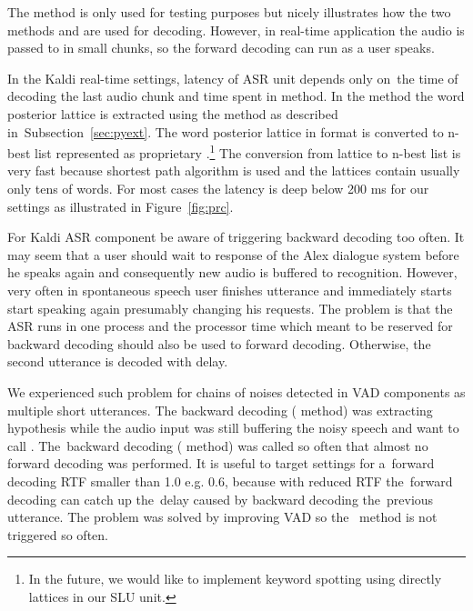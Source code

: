 
The method  is only used for testing purposes but nicely illustrates how the two methods  and  are used for decoding. 
However, in real-time application the audio is passed to  in small chunks, so the forward decoding can run as a user speaks. 

In the Kaldi real-time settings, latency of \ac{ASR} unit depends only on~the time of decoding the last audio chunk and time spent in  method.
In the  method the word posterior lattice is extracted using the  method as described in~Subsection~\ref{sec:pyext}. 
The word posterior lattice in  format is converted to n-best list represented as proprietary .\footnote{In the future, we would like to implement keyword spotting using directly  lattices in our \ac{SLU} unit.}
The conversion from lattice to n-best list is very fast because  shortest path algorithm is used and the lattices contain usually only tens of words.
For most cases the latency is deep below 200 ms for our settings as illustrated in Figure~\ref{fig:prc}.

For Kaldi \ac{ASR} component be aware of triggering backward decoding too often. 
It may seem that a user should wait to response of the Alex dialogue system before he speaks again and consequently new audio is buffered to recognition.
However, very often in spontaneous speech user finishes utterance and immediately starts start speaking again presumably changing his requests.
The problem is that the \ac{ASR} runs in one process and the processor time which meant to be reserved for backward decoding should also be used to forward decoding.
Otherwise, the second utterance is decoded with delay.

We experienced such problem for chains of noises detected in \ac{VAD} components as multiple short utterances.
The backward decoding ( method) was extracting hypothesis while the audio input was still buffering the noisy speech and want to call .
The~backward decoding ( method) was called so often that almost no forward decoding was performed.
It is useful to target settings for a~forward decoding \ac{RTF} smaller than 1.0 e.g. 0.6, because with reduced RTF the~forward decoding can catch up the~delay caused by backward decoding the~previous utterance.
The problem was solved by improving \ac{VAD} so the~ method is not triggered so often.


